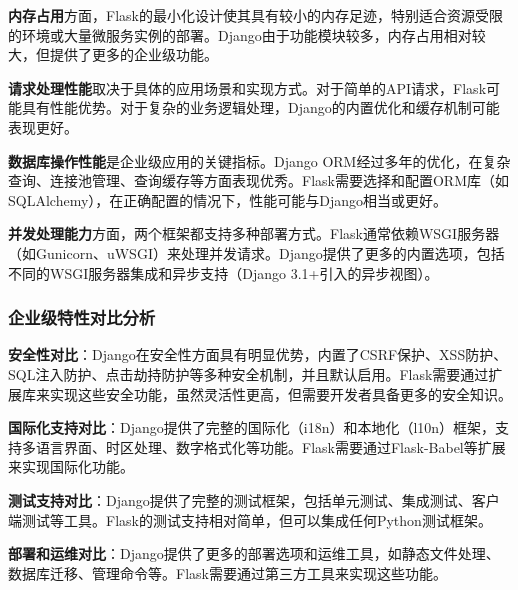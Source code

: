 \textbf{内存占用}方面，Flask的最小化设计使其具有较小的内存足迹，特别适合资源受限的环境或大量微服务实例的部署。Django由于功能模块较多，内存占用相对较大，但提供了更多的企业级功能。

\textbf{请求处理性能}取决于具体的应用场景和实现方式。对于简单的API请求，Flask可能具有性能优势。对于复杂的业务逻辑处理，Django的内置优化和缓存机制可能表现更好。

\textbf{数据库操作性能}是企业级应用的关键指标。Django ORM经过多年的优化，在复杂查询、连接池管理、查询缓存等方面表现优秀。Flask需要选择和配置ORM库（如SQLAlchemy），在正确配置的情况下，性能可能与Django相当或更好。

\textbf{并发处理能力}方面，两个框架都支持多种部署方式。Flask通常依赖WSGI服务器（如Gunicorn、uWSGI）来处理并发请求。Django提供了更多的内置选项，包括不同的WSGI服务器集成和异步支持（Django 3.1+引入的异步视图）。

\subsubsection{企业级特性对比分析}\label{ux4f01ux4e1aux7ea7ux7279ux6027ux5bf9ux6bd4ux5206ux6790}

\textbf{安全性对比}：Django在安全性方面具有明显优势，内置了CSRF保护、XSS防护、SQL注入防护、点击劫持防护等多种安全机制，并且默认启用。Flask需要通过扩展库来实现这些安全功能，虽然灵活性更高，但需要开发者具备更多的安全知识。

\textbf{国际化支持对比}：Django提供了完整的国际化（i18n）和本地化（l10n）框架，支持多语言界面、时区处理、数字格式化等功能。Flask需要通过Flask-Babel等扩展来实现国际化功能。

\textbf{测试支持对比}：Django提供了完整的测试框架，包括单元测试、集成测试、客户端测试等工具。Flask的测试支持相对简单，但可以集成任何Python测试框架。

\textbf{部署和运维对比}：Django提供了更多的部署选项和运维工具，如静态文件处理、数据库迁移、管理命令等。Flask需要通过第三方工具来实现这些功能。


